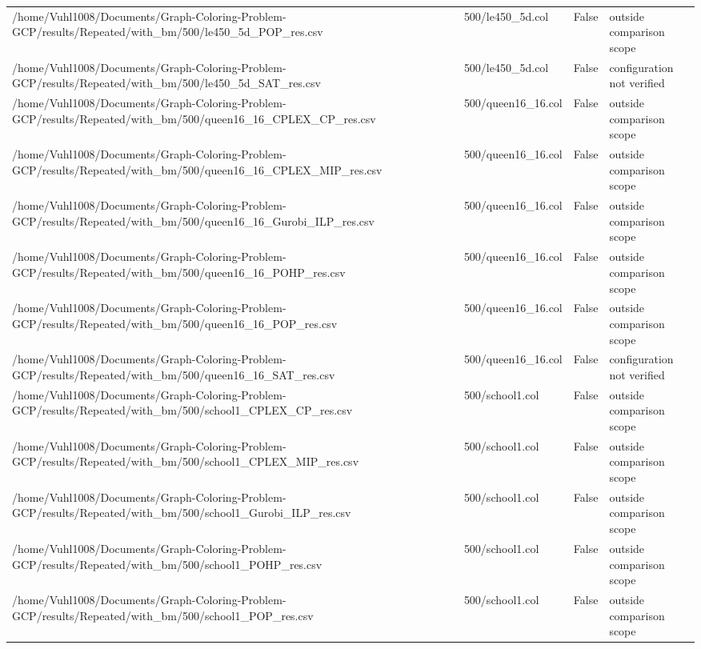 \begin{table}[htbp]
\begin{tabular}{llll}
/home/Vuhl1008/Documents/Graph-Coloring-Problem-GCP/results/Repeated/with\_bm/500/le450\_5d\_POP\_res.csv & 500/le450\_5d.col & False & outside comparison scope \\
/home/Vuhl1008/Documents/Graph-Coloring-Problem-GCP/results/Repeated/with\_bm/500/le450\_5d\_SAT\_res.csv & 500/le450\_5d.col & False & configuration not verified \\
/home/Vuhl1008/Documents/Graph-Coloring-Problem-GCP/results/Repeated/with\_bm/500/queen16\_16\_CPLEX\_CP\_res.csv & 500/queen16\_16.col & False & outside comparison scope \\
/home/Vuhl1008/Documents/Graph-Coloring-Problem-GCP/results/Repeated/with\_bm/500/queen16\_16\_CPLEX\_MIP\_res.csv & 500/queen16\_16.col & False & outside comparison scope \\
/home/Vuhl1008/Documents/Graph-Coloring-Problem-GCP/results/Repeated/with\_bm/500/queen16\_16\_Gurobi\_ILP\_res.csv & 500/queen16\_16.col & False & outside comparison scope \\
/home/Vuhl1008/Documents/Graph-Coloring-Problem-GCP/results/Repeated/with\_bm/500/queen16\_16\_POHP\_res.csv & 500/queen16\_16.col & False & outside comparison scope \\
/home/Vuhl1008/Documents/Graph-Coloring-Problem-GCP/results/Repeated/with\_bm/500/queen16\_16\_POP\_res.csv & 500/queen16\_16.col & False & outside comparison scope \\
/home/Vuhl1008/Documents/Graph-Coloring-Problem-GCP/results/Repeated/with\_bm/500/queen16\_16\_SAT\_res.csv & 500/queen16\_16.col & False & configuration not verified \\
/home/Vuhl1008/Documents/Graph-Coloring-Problem-GCP/results/Repeated/with\_bm/500/school1\_CPLEX\_CP\_res.csv & 500/school1.col & False & outside comparison scope \\
/home/Vuhl1008/Documents/Graph-Coloring-Problem-GCP/results/Repeated/with\_bm/500/school1\_CPLEX\_MIP\_res.csv & 500/school1.col & False & outside comparison scope \\
/home/Vuhl1008/Documents/Graph-Coloring-Problem-GCP/results/Repeated/with\_bm/500/school1\_Gurobi\_ILP\_res.csv & 500/school1.col & False & outside comparison scope \\
/home/Vuhl1008/Documents/Graph-Coloring-Problem-GCP/results/Repeated/with\_bm/500/school1\_POHP\_res.csv & 500/school1.col & False & outside comparison scope \\
/home/Vuhl1008/Documents/Graph-Coloring-Problem-GCP/results/Repeated/with\_bm/500/school1\_POP\_res.csv & 500/school1.col & False & outside comparison scope \\

\end{tabular}
\end{table}
